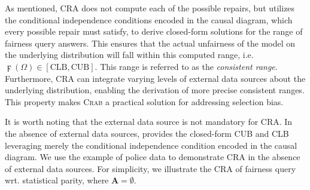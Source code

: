 \documentclass[11pt]{article}
\newcommand{\underlyingDist}{\Omega}
\newcommand{\lowerbound}{{\text{CLB}}}
\newcommand{\upperbound}{\text{CUB}}
\newcommand{\Admis}{\boldsymbol{A}}
\newcommand{\dist}{{\underlyingDist}}
\newcommand{\sCondDemoParityDist}[1]{\digamma(#1)}
\newcommand{\crab}{\textsc{Crab}\xspace}
\begin{document}
As mentioned, CRA does not compute each of the possible repairs, but utilizes the conditional independence conditions encoded in the causal diagram, which every possible repair must satisfy, to derive closed-form solutions for the range of fairness query answers. 
This ensures that the actual unfairness of the model on the underlying distribution will fall within this computed range, i.e. $\sCondDemoParityDist{\dist}\in [\lowerbound,\upperbound]$. This range is referred to as the \emph{consistent range}.
Furthermore, CRA can integrate varying levels of external data sources about the underlying distribution, enabling the derivation of more precise consistent ranges. This property makes \crab a practical solution for addressing selection bias.

It is worth noting that the external data source is not mandatory for CRA. In the absence of external data sources, \cite{zhu2023consistent} provides the closed-form CUB and CLB leveraging merely the conditional independence condition encoded in the causal diagram. We use the example of police data to demonstrate CRA in the absence of external data sources. For simplicity, we illustrate the CRA of fairness query wrt. statistical parity, where $\Admis=\emptyset$.
\end{document}
